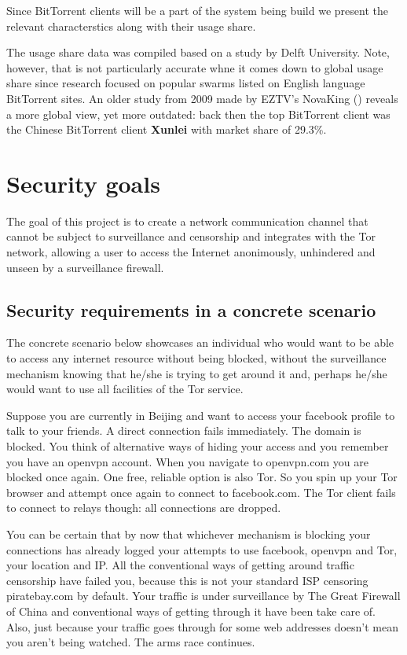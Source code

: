 \documentclass[11pt]{article} %
\begin{document}
Since BitTorrent clients will be a part of the system being build we present the relevant characterstics along with their usage share.

The usage share data was compiled based on a study by Delft University. Note, however, that is not particularly accurate whne it comes down to global usage share since research focused on popular swarms listed on English language BitTorrent sites. An older study from 2009 made by EZTV’s NovaKing (\citep*{web:oldbtUsage}) reveals a more global view, yet more outdated: back then the top BitTorrent client was the Chinese BitTorrent client \textbf{Xunlei} with market share of 29.3\%.

\section{Security goals}

The goal of this project is to create a network communication channel that cannot be subject to surveillance and censorship and integrates with the Tor network, allowing a user to access the Internet anonimously, unhindered and unseen by a surveillance firewall.

\subsection{Security requirements in a concrete scenario}

The concrete scenario below showcases an individual who would want to be able to access any internet resource without being blocked, without the surveillance mechanism knowing that he/she is trying to get around it and, perhaps he/she would want to use all facilities of the Tor service.

Suppose you are currently in Beijing and want to access your facebook profile to talk to your friends. A direct connection fails immediately. The domain is blocked. You think of alternative ways of hiding your access and you remember you have an openvpn account. When you navigate to openvpn.com you are blocked once again. One free, reliable option is also Tor. So you spin up your Tor browser and attempt once again to connect to facebook.com. The Tor client fails to connect to relays though: all connections are dropped.  \citep*{web:blockedInChina}

You can be certain that by now that whichever mechanism is blocking your connections has already logged your attempts to use facebook, openvpn and Tor, your location and IP.  All the conventional ways of getting around traffic censorship have failed you, because this is not your standard ISP censoring piratebay.com by default. Your traffic is under surveillance by The Great Firewall of China and conventional ways of getting through it have been take care of. Also, just because your traffic goes through for some web addresses doesn't mean you aren't being watched. The arms race continues.
\end{document}

